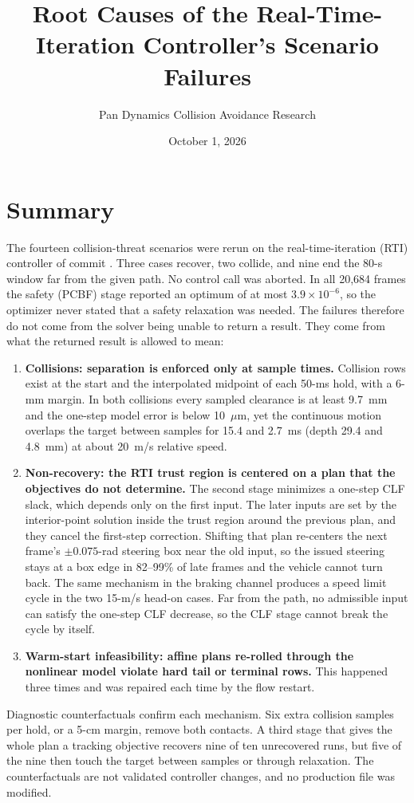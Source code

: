 \documentclass[11pt]{article}
\title{Root Causes of the Real-Time-Iteration Controller's Scenario Failures}
\author{Pan Dynamics Collision Avoidance Research}
\date{October 1, 2026}
\begin{document}
\maketitle

\section{Summary}
The fourteen collision-threat scenarios were rerun on the real-time-iteration
(RTI) controller of commit .
Three cases recover, two collide, and nine end the 80-s window far from the
given path. No control call was aborted. In all 20{,}684 frames the
safety (PCBF) stage reported an optimum of at most $3.9\times10^{-6}$, so the
optimizer never stated that a safety relaxation was needed. The failures
therefore do not come from the solver being unable to return a result. They
come from what the returned result is allowed to mean:
\begin{enumerate}
\item \textbf{Collisions: separation is enforced only at sample times.}
Collision rows exist at the start and the interpolated midpoint of each 50-ms
hold, with a 6-mm margin. In both collisions every sampled clearance is at
least 9.7~mm and the one-step model error is below 10~$\mu$m, yet the
continuous motion overlaps the target between samples for 15.4 and 2.7~ms
(depth 29.4 and 4.8~mm) at about 20~m/s relative speed.
\item \textbf{Non-recovery: the RTI trust region is centered on a plan that the
objectives do not determine.} The second stage minimizes a one-step CLF
slack, which depends only on the first input. The later inputs are set by
the interior-point solution inside the trust region around the previous plan,
and they cancel the first-step correction. Shifting that plan re-centers the
next frame's $\pm0.075$-rad steering box near the old input, so the issued
steering stays at a box edge in 82--99\% of late frames and the vehicle cannot
turn back. The same mechanism in the braking channel produces a speed limit
cycle in the two 15-m/s head-on cases. Far from the path, no admissible input can satisfy the one-step
CLF decrease, so the CLF stage cannot break the cycle by itself.
\item \textbf{Warm-start infeasibility: affine plans re-rolled through the
nonlinear model violate hard tail or terminal rows.} This happened three
times and was repaired each time by the flow restart.
\end{enumerate}
Diagnostic counterfactuals confirm each mechanism. Six extra collision samples
per hold, or a 5-cm margin, remove both contacts. A third stage that gives the
whole plan a tracking objective recovers nine of ten unrecovered runs, but five
of the nine then touch the target between samples or through relaxation. The
counterfactuals are not validated controller changes, and no production file was
modified.
\end{document}
